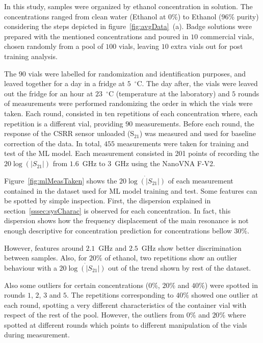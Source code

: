 \documentclass[journal,twoside,web]{ieeecolor}
\begin{document}
In this study, samples were organized by ethanol concentration in solution. The concentrations ranged from clean water (Ethanol at $0\%$) to Ethanol ($96\%$ purity) considering the steps depicted in figure~\ref{fig:avgData}~(a). Badge solutions were prepared with the mentioned concentrations and poured in $10$ commercial vials, chosen randomly from a pool of $100$ vials, leaving $10$ extra vials out for post training analysis.

The $90$ vials were labelled for randomization and identification purposes, and leaved together for a day in a fridge at $5$~$^{\circ}$C. The day after, the vials were leaved out the fridge for an hour at $23$~$^{\circ}$C (temperature at the laboratory) and $5$ rounds of measurements were performed randomizing the order in which the vials were taken. Each round, consisted in ten repetitions of each concentration where, each repetition is a different vial, providing $90$ measurements. Before each round, the response of the CSRR sensor unloaded (S$_{21}$) was measured and used for baseline correction of the data. In total, $455$ measurements were taken for training and test of the ML model. Each measurement consisted in 201 points of recording the $20\dot{\log\left(|S_{21}|\right)}$ from $1.6$~GHz to $3$~GHz using the NanoVNA F-V2.

Figure~\ref{fig:mlMeasTaken} shows the $20\dot{\log\left(|S_{21}|\right)}$ of each measurement contained in the dataset used for ML model training and test. Some features can be spotted by simple inspection. First, the dispersion explained in section~\ref{sssec:sysCharac} is observed for each concentration. In fact, this dispersion shows how the frequency displacement of the main resonance is not enough descriptive for concentration prediction for concentrations bellow $30\%$. 

However, features around $2.1$~GHz and $2.5$~GHz show better discrimination between samples. Also, for $20\%$ of ethanol, two repetitions show an outlier behaviour with a $20\dot{\log\left(|S_{21}|\right)}$ out of the trend shown by rest of the dataset.  

Also some outliers for certain concentrations ($0\%$, $20\%$ and $40\%$) were spotted in rounds $1$, $2$, $3$ and $5$. The repetitions corresponding to $40\%$ showed one outlier at each round, spotting a very different characteristics of the container vial with respect of the rest of the pool. However, the outliers from $0\%$ and $20\%$ where spotted at different rounds which points to different manipulation of the vials during measurement.        
\end{document}
